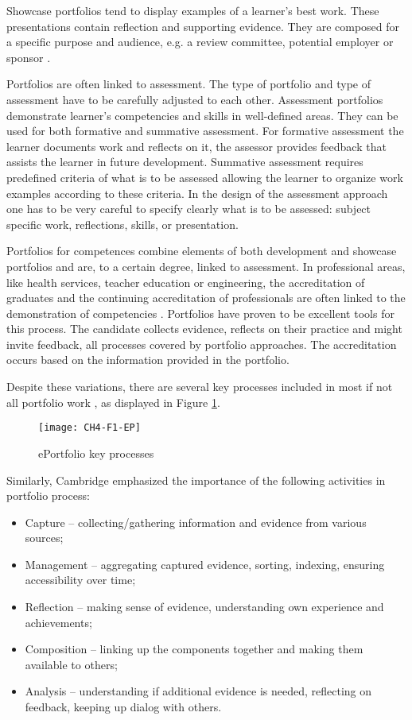 Showcase portfolios tend to display examples of a learner's best work. These
presentations contain reflection and supporting evidence. They are composed for
a specific purpose and audience, e.g. a review committee, potential employer or
sponsor \citep{Lorenzo2005}.

Portfolios are often linked to assessment. The type of portfolio and type of
assessment have to be carefully adjusted to each other. Assessment portfolios
demonstrate learner's competencies and skills in well-defined areas. They can be
used for both formative and summative assessment. For formative assessment the
learner documents work and reflects on it, the assessor provides feedback that
assists the learner in future development. Summative assessment requires
predefined criteria of what is to be assessed allowing the learner to organize
work examples according to these criteria. In the design of the assessment
approach one has to be very careful to specify clearly what is to be assessed:
subject specific work, reflections, \LLLs skills, or presentation.

Portfolios for competences combine elements of both development and showcase
portfolios and are, to a certain degree, linked to assessment. In professional
areas, like health services, teacher education or engineering, the accreditation
of graduates and the continuing accreditation of professionals are often linked
to the demonstration of competencies \citep{IPENZ2007,Sullivan2004,Boyatzis2008}.
Portfolios have proven to be excellent tools for this process. The candidate
collects evidence, reflects on their practice and might invite feedback, all
processes covered by portfolio approaches. The accreditation occurs based on the
information provided in the portfolio.

Despite these variations, there are several key processes included in most if
not all portfolio work \citep{Malloff2010, Heinrich2012}, as displayed in
Figure \ref{fig:ep}.

\begin{figure}[hb]
\centering
\texttt{[image: CH4-F1-EP]}
\caption{ePortfolio key processes}
\label{fig:ep}
\end{figure}

Similarly, Cambridge \citeyearpar{Cambridge2010} emphasized the importance of
the following activities in portfolio process:

\begin{itemize}
  \item Capture -- collecting/gathering information and evidence from various
  sources;
  \item Management -- aggregating captured evidence, sorting, indexing, ensuring
  accessibility over time;
  \item Reflection -- making sense of evidence, understanding own experience and
  achievements;
  \item Composition -- linking up the components together and making them
  available to others;
  \item Analysis -- understanding if additional evidence is needed, reflecting
  on feedback, keeping up dialog with others.
\end{itemize}
 
